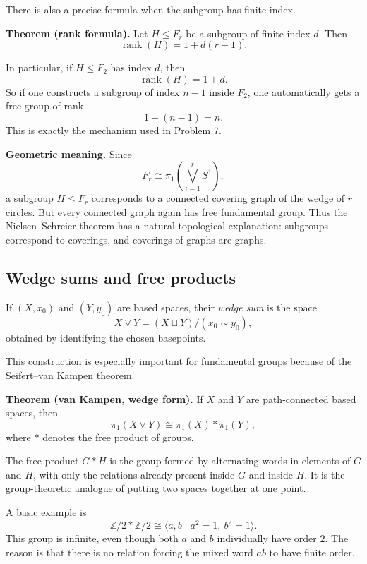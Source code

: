 \documentclass[12pt,a4paper]{article}
\DeclareMathOperator{\rank}{rank}
\theoremstyle{notespace}
\begin{document}
There is also a precise formula when the subgroup has finite index.

\medskip

\textbf{Theorem (rank formula).}
Let \(H\leq F_r\) be a subgroup of finite index \(d\). Then
\[
\rank(H)=1+d(r-1).
\]

\medskip

In particular, if \(H\leq F_2\) has index \(d\), then
\[
\rank(H)=1+d.
\]
So if one constructs a subgroup of index \(n-1\) inside \(F_2\), one automatically gets a free group of rank
\[
1+(n-1)=n.
\]
This is exactly the mechanism used in Problem 7.

\medskip

\textbf{Geometric meaning.}
Since
\[
F_r\cong \pi_1\!\left(\bigvee_{i=1}^r S^1\right),
\]
a subgroup \(H\leq F_r\) corresponds to a connected covering graph of the wedge of \(r\) circles. But every connected graph again has free fundamental group. Thus the Nielsen--Schreier theorem has a natural topological explanation: subgroups correspond to coverings, and coverings of graphs are graphs.

\subsection{Wedge sums and free products}

If \((X,x_0)\) and \((Y,y_0)\) are based spaces, their \emph{wedge sum} is the space
\[
X\vee Y=(X\sqcup Y)/(x_0\sim y_0),
\]
obtained by identifying the chosen basepoints.

This construction is especially important for fundamental groups because of the Seifert--van Kampen theorem.

\medskip

\textbf{Theorem (van Kampen, wedge form).}
If \(X\) and \(Y\) are path-connected based spaces, then
\[
\pi_1(X\vee Y)\cong \pi_1(X)*\pi_1(Y),
\]
where \(*\) denotes the free product of groups.

\medskip

The free product \(G*H\) is the group formed by alternating words in elements of \(G\) and \(H\), with only the relations already present inside \(G\) and inside \(H\). It is the group-theoretic analogue of putting two spaces together at one point.

A basic example is
\[
\mathbb Z/2 * \mathbb Z/2
\cong
\langle a,b\mid a^2=1,\ b^2=1\rangle.
\]
This group is infinite, even though both \(a\) and \(b\) individually have order \(2\). The reason is that there is no relation forcing the mixed word \(ab\) to have finite order.
\end{document}
